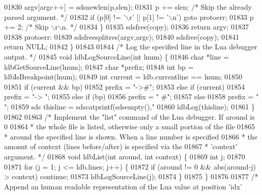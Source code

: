 \begin{DoxyCode}
{{{{{{{{{{{{{{01830         argv[argc++] = sdsnewlen(p,slen);
01831         p += slen; \textcolor{comment}{/* Skip the already parsed argument. */}
01832         \textcolor{keywordflow}{if} (p[0] != \textcolor{stringliteral}{'\(\backslash\)r'} || p[1] != \textcolor{stringliteral}{'\(\backslash\)n'}) \textcolor{keywordflow}{goto} protoerr;
01833         p += 2; \textcolor{comment}{/* Skip \(\backslash\)r\(\backslash\)n. */}
01834     \}
01835     sdsfree(copy);
01836     \textcolor{keywordflow}{return} argv;
01837 
01838 protoerr:
01839     sdsfreesplitres(argv,argc);
01840     sdsfree(copy);
01841     \textcolor{keywordflow}{return} NULL;
01842 \}
01843 
01844 \textcolor{comment}{/* Log the specified line in the Lua debugger output. */}
01845 \textcolor{keywordtype}{void} ldbLogSourceLine(\textcolor{keywordtype}{int} lnum) \{
01846     \textcolor{keywordtype}{char} *line = ldbGetSourceLine(lnum);
01847     \textcolor{keywordtype}{char} *prefix;
01848     \textcolor{keywordtype}{int} bp = ldbIsBreakpoint(lnum);
01849     \textcolor{keywordtype}{int} current = ldb.currentline == lnum;
01850 
01851     \textcolor{keywordflow}{if} (current && bp)
01852         prefix = \textcolor{stringliteral}{"->#"};
01853     \textcolor{keywordflow}{else} \textcolor{keywordflow}{if} (current)
01854         prefix = \textcolor{stringliteral}{"-> "};
01855     \textcolor{keywordflow}{else} \textcolor{keywordflow}{if} (bp)
01856         prefix = \textcolor{stringliteral}{"  #"};
01857     \textcolor{keywordflow}{else}
01858         prefix = \textcolor{stringliteral}{"   "};
01859     sds thisline = sdscatprintf(sdsempty(),\textcolor{stringliteral}{"%
01860     ldbLog(thisline);
01861 \}
01862 
01863 \textcolor{comment}{/* Implement the "list" command of the Lua debugger. If around is 0}
01864 \textcolor{comment}{ * the whole file is listed, otherwise only a small portion of the file}
01865 \textcolor{comment}{ * around the specified line is shown. When a line number is specified}
01866 \textcolor{comment}{ * the amonut of context (lines before/after) is specified via the}
01867 \textcolor{comment}{ * 'context' argument. */}
01868 \textcolor{keywordtype}{void} ldbList(\textcolor{keywordtype}{int} around, \textcolor{keywordtype}{int} context) \{
01869     \textcolor{keywordtype}{int} j;
01870 
01871     \textcolor{keywordflow}{for} (j = 1; j <= ldb.lines; j++) \{
01872         \textcolor{keywordflow}{if} (around != 0 && abs(around-j) > context) \textcolor{keywordflow}{continue};
01873         ldbLogSourceLine(j);
01874     \}
01875 \}
01876 
01877 \textcolor{comment}{/* Append an human readable representation of the Lua value at position 'idx'}
}}}}}}}}}}}}}}}
\end{DoxyCode}
